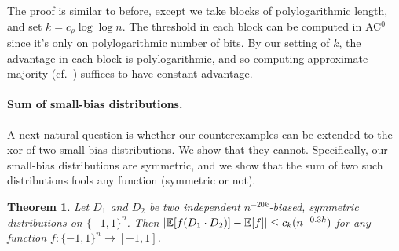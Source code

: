 \documentclass[10pt,a4paper]{article}
\newtheorem{theorem}{Theorem}%
\newtheorem{corollary}[theorem]{Corollary}
\theoremstyle{definition}
\renewcommand{\Pr}{\mathop{\mathbb{P}\/}}
\newcommand{\E}{\mathop{\mathbb{E}\/}}
\newcommand{\poly}{\textnormal{poly}}
\newcommand{\pmo}{\{-1,1\}}
\DeclarePairedDelimiter\abs{\lvert}{\rvert}
\newcommand{\summ}[1]{%
  \begingroup\noexpandarg
  \StrLen{#1}[\temp]%
  1^\top
  \ifnum\temp>1
    (#1)%
  \else
    #1%
  \fi 
  \endgroup
}
\newcommand{\peter}[1]{\footnote{{\bf \color{green}Peter}: {#1}}}
\newcommand{\peter}[1]{}
\begin{document}
The proof is similar to before, except we take blocks of polylogarithmic length, and set $k = c_\rho \log \log n$.  The threshold in each block can be computed in AC$^0$ since it's only on polylogarithmic number of bits.  By our setting of $k$, the advantage in each block is polylogarithmic, and so computing approximate majority \cite{Ajt83} (cf.~\cite{ViolaBPvsE}) suffices to have constant advantage.

%
%
%
%
%
%
%
%
%

\paragraph{Sum of small-bias distributions.}
%
A next natural question is whether our counterexamples can be extended to the xor of two small-bias distributions.  We show that they cannot.  Specifically, our small-bias distributions are symmetric, and we show that the sum of two such distributions fools any function (symmetric or not).


\begin{theorem} \label{thm:sym-xor-sym-fools-any}
Let $D_1$ and $D_2$ be two independent $n^{-20k}$-biased, symmetric distributions on $\pmo^n$.
Then $\abs{\E[f(D_1 \cdot D_2)] - \E[f]} \le c_k(n^{-0.3k})$ for any function $f\colon\pmo^n \to [-1,1]$.
\end{theorem}
\end{document}
